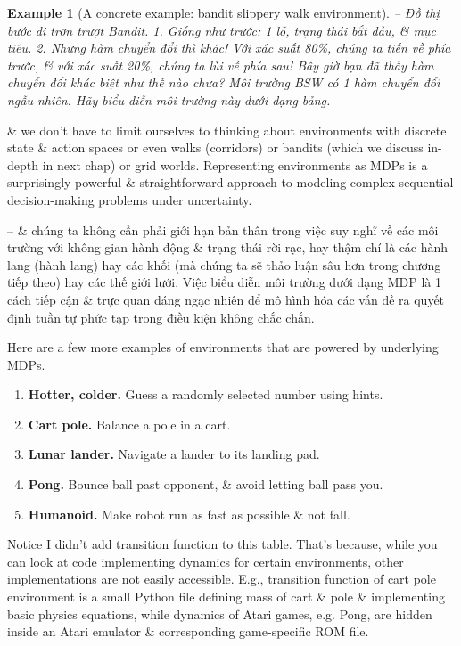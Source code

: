 \documentclass{article}
\newtheorem{example}{Example}
\begin{document}
\begin{itemize}
\begin{itemize}
\begin{itemize}
\begin{example}[A concrete example: bandit slippery walk environment]
                -- {\sf Đồ thị bước đi trơn trượt Bandit.} 1. Giống như trước: 1 lỗ, trạng thái bắt đầu, \& mục tiêu. 2. Nhưng hàm chuyển đổi thì khác! Với xác suất 80\%, chúng ta tiến về phía trước, \& với xác suất 20\%, chúng ta lùi về phía sau! Bây giờ bạn đã thấy hàm chuyển đổi khác biệt như thế nào chưa? Môi trường BSW có 1 hàm chuyển đổi ngẫu nhiên. Hãy biểu diễn môi trường này dưới dạng bảng.
            \end{example}
            \& we don't have to limit ourselves to thinking about environments with discrete state \& action spaces or even walks (corridors) or bandits (which we discuss in-depth in next chap) or grid worlds. Representing environments as MDPs is a surprisingly powerful \& straightforward approach to modeling complex sequential decision-making problems under uncertainty.

            -- \& chúng ta không cần phải giới hạn bản thân trong việc suy nghĩ về các môi trường với không gian hành động \& trạng thái rời rạc, hay thậm chí là các hành lang (hành lang) hay các khối (mà chúng ta sẽ thảo luận sâu hơn trong chương tiếp theo) hay các thế giới lưới. Việc biểu diễn môi trường dưới dạng MDP là 1 cách tiếp cận \& trực quan đáng ngạc nhiên để mô hình hóa các vấn đề ra quyết định tuần tự phức tạp trong điều kiện không chắc chắn.

            Here are a few more examples of environments that are powered by underlying MDPs.
            \begin{enumerate}
                \item {\bf Hotter, colder.} Guess a randomly selected number using hints.
                \item {\bf Cart pole.} Balance a pole in a cart.
                \item {\bf Lunar lander.} Navigate a lander to its landing pad.
                \item {\bf Pong.} Bounce ball past opponent, \& avoid letting ball pass you.
                \item {\bf Humanoid.} Make robot run as fast as possible \& not fall.
            \end{enumerate}
            Notice I didn't add transition function to this table. That's because, while you can look at code implementing dynamics for certain environments, other implementations are not easily accessible. E.g., transition function of cart pole environment is a small Python file defining mass of cart \& pole \& implementing basic physics equations, while dynamics of Atari games, e.g. Pong, are hidden inside an Atari emulator \& corresponding game-specific ROM file.


\end{itemize}
\end{itemize}
\end{itemize}
\end{document}

